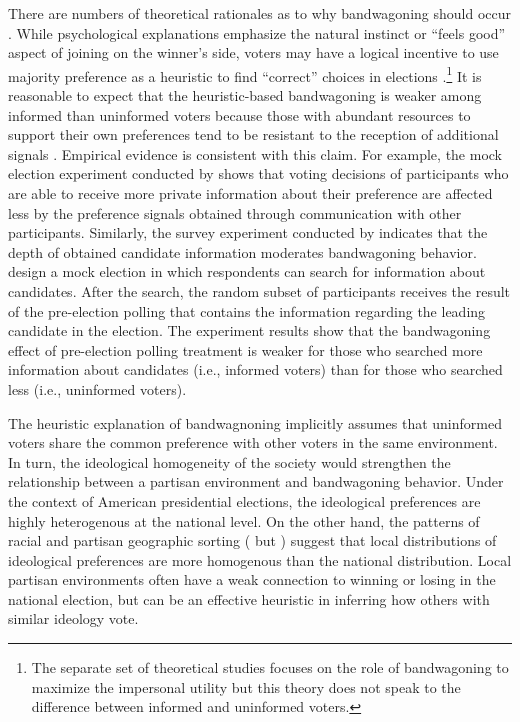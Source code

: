 \documentclass[letterpaper, 12pt]{article}
\begin{document}
    \par There are numbers of theoretical rationales as to why bandwagoning should occur \citep{Hardmeier2008thef}. While psychological explanations emphasize the natural instinct or ``feels good'' aspect of joining on the winner's side, voters may have a logical incentive to use majority preference as a heuristic to find ``correct'' choices in elections \citep{Lupia1994shve, Lau2001adan}.\footnote{The separate set of theoretical studies focuses on the role of bandwagoning to maximize the impersonal utility \citep{Coate2004grru, Feddersen2006thca, Feddersen2006thof} but this theory does not speak to the difference between informed and uninformed voters.} It is reasonable to expect that the heuristic-based bandwagoning is weaker among informed than uninformed voters because those with abundant resources to support their own preferences tend to be resistant to the reception of additional signals \citep{Zaller1992thna}. Empirical evidence is consistent with this claim. For example, the mock election experiment conducted by \cite{Huckfeldt2014nobi} shows that voting decisions of participants who are able to receive more private information about their preference are affected less by the preference signals obtained through communication with other participants. Similarly, the survey experiment conducted by \cite{Roy2015anex} indicates that the depth of obtained candidate information moderates bandwagoning behavior. \cite{Roy2015anex} design a mock election in which respondents can search for information about candidates. After the search, the random subset of participants receives the result of the pre-election polling that contains the information regarding the leading candidate in the election. The experiment results show that the bandwagoning effect of pre-election polling treatment is weaker for those who searched more information about candidates (i.e., informed voters) than for those who searched less (i.e., uninformed voters). 
    
    \par The heuristic explanation of bandwagnoning implicitly assumes that uninformed voters share the common preference with other voters in the same environment. In turn, the ideological homogeneity of the society would strengthen the relationship between a partisan environment and bandwagoning behavior. Under the context of American presidential elections, the ideological preferences are highly heterogenous at the national level. On the other hand, the patterns of racial and partisan geographic sorting (\citealt{Charles2003thdy,TamCho2013vomi} but \citealt{Mummolo2017whpa}) suggest that local distributions of ideological preferences are more homogenous than the national distribution. Local partisan environments often have a weak connection to winning or losing in the national election, but can be an effective heuristic in inferring how others with similar ideology vote.
\end{document}
